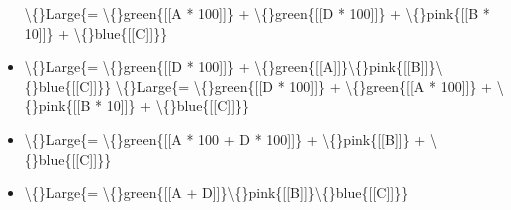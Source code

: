 \documentclass{article}
\begin{document}
\begin{itemize}
                        
                        \textbackslash\{\}Large\{= \textbackslash\{\}green\{[[A * 100]]\} + \textbackslash\{\}green\{[[D * 100]]\} + \textbackslash\{\}pink\{[[B * 10]]\} + \textbackslash\{\}blue\{[[C]]\}\}
  \item \textbackslash\{\}Large\{= \textbackslash\{\}green\{[[D * 100]]\} + \textbackslash\{\}green\{[[A]]\}\textbackslash\{\}pink\{[[B]]\}\textbackslash\{\}blue\{[[C]]\}\}
                        \textbackslash\{\}Large\{= \textbackslash\{\}green\{[[D * 100]]\} + \textbackslash\{\}green\{[[A * 100]]\} + \textbackslash\{\}pink\{[[B * 10]]\} + \textbackslash\{\}blue\{[[C]]\}\}
  \item \textbackslash\{\}Large\{= \textbackslash\{\}green\{[[A * 100 + D * 100]]\} + \textbackslash\{\}pink\{[[B]]\} + \textbackslash\{\}blue\{[[C]]\}\}
  \item \textbackslash\{\}Large\{= \textbackslash\{\}green\{[[A + D]]\}\textbackslash\{\}pink\{[[B]]\}\textbackslash\{\}blue\{[[C]]\}\}
\end{itemize}
\end{document}
